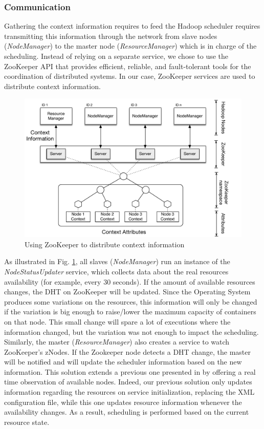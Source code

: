 \subsubsection*{Communication}
Gathering the context information requires to feed the Hadoop scheduler requires transmitting this information through the network from slave nodes (\textit{NodeManager}) to the master node (\textit{ResourceManager}) which is in charge of the scheduling. Instead of relying on a separate service, we chose to use the ZooKeeper API \cite{Hunt2010} that provides efficient, reliable, and fault-tolerant tools for the coordination of distributed systems. In our case, ZooKeeper services are used to distribute context information. 

\begin{figure}
	\centering
	\includegraphics[width=1\linewidth]{img/Zookeeper} 
	\caption{Using ZooKeeper to distribute context information\label{fig:zookeeper}}
\end{figure}


As illustrated in Fig. \ref{fig:zookeeper}, all slaves (\textit{NodeManager}) run an instance of the \textit{NodeStatusUpdater} service, which collects data about the real resources availability (for example, every 30 seconds). If the amount of available resources changes, the DHT on ZooKeeper will be updated. Since the Operating System produces some variations on the resources, this information will only be changed if the variation is big enough to raise/lower the maximum capacity of containers on that node. This small change will spare a lot of executions where the information changed, but the variation was not enough to impact the scheduling. Similarly, the master (\textit{ResourceManager}) also creates a service to watch ZooKeeper's zNodes. If the Zookeeper node detects a DHT change, the master will be notified and will update the scheduler information based on the new information. This solution extends a previous one presented in \cite{UBICOMM2014} by offering a real time observation of available nodes. Indeed, our previous solution only updates information regarding the resources on service initialization, replacing the XML configuration file, while this one updates resource information whenever the availability changes. As a result, scheduling is performed based on the current resource state.


